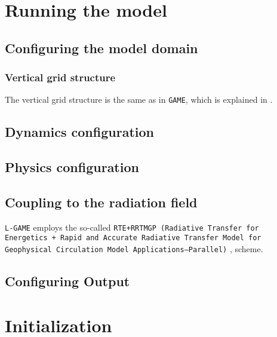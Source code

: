 \documentclass[10pt]{report}
\begin{document}
\chapter{Running the model}
\label{chap:running_the_model}

\section{Configuring the model domain}
\label{sec:configuring_the_model_domain}

\subsection{Vertical grid structure}
\label{sec:vertical_grid_structure}

The vertical grid structure is the same as in \texttt{GAME}, which is explained in \cite{game_handbook}.

\section{Dynamics configuration}
\label{sec:dynamics_configuration}

\section{Physics configuration}
\label{sec:physics_configuration}

\section{Coupling to the radiation field}
\label{sec:coupling_to_the_radiation_field}

\texttt{L-GAME} employs the so-called \texttt{RTE+RRTMGP (Radiative Transfer for Energetics + Rapid and Accurate Radiative Transfer Model for Geophysical Circulation Model Applications—Parallel)} \cite{doi:10.1029/2019MS001621}, \cite{rte-rrtmgp-github} scheme.

\section{Configuring Output}
\label{sec:configuring_output}

\chapter{Initialization}
\label{sec:initialization}
\end{document}
